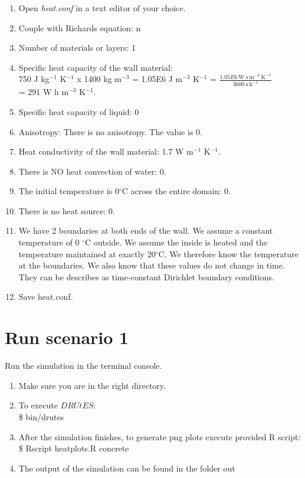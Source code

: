 \documentclass[
10pt, %
a4paper, %
oneside, %
headinclude,footinclude, %
BCOR5mm, %
]{scrartcl}
\begin{document}
\begin{enumerate}
\item Open \emph{heat.conf} in a text editor of your choice. 

\item Couple with Richards equation: n
\item Number of materials or layers: 1 
\item Specific heat capacity of the wall material: \\750 J kg$^{-1}$ K$^{-1}$ x 1400 kg m$^{-3}$ = 1.05E6 J m$^{-3}$ K$^{-1}$ = $\frac{1.05E6~\mathrm{W~s~m^{-3}~K^{-1}}}{3600~\mathrm{s~h^{-1}}}$ \\= 291 W h m$^{-3}$ K$^{-1}$. 
\item Specific heat capacity of liquid: 0
\item Anisotropy: There is no anisotropy. The value is 0.
\item Heat conductivity of the wall material: 1.7 W m$^{-1}$ K$^{-1}$. 
\item There is NO heat convection of water: 0.
\item The initial temperature is 0$^{\circ}$C across the entire domain: 0.
\item There is no heat source: 0. 
\item We have 2 boundaries at both ends of the wall. We assume a constant temperature of 0 $^{\circ}$C outside. We assume the inside is heated and the temperature maintained at exactly 20$^{\circ}$C. We therefore know the temperature at the boundaries. We also know that these values do not change in time. They can be describes as time-constant Dirichlet boundary conditions. \\

\item Save heat.conf.
\end{enumerate}

\section*{Run scenario 1}
Run the simulation in the terminal console.
\begin{enumerate}
\item Make sure you are in the right directory. 
\item To execute $DRUtES$: \\
\$ bin/drutes
\item After the simulation finishes, to generate png plots execute provided R script: \\
\$ Rscript heatplots.R concrete
\item The output of the simulation can be found in the folder out
\end{enumerate}
\end{document}
